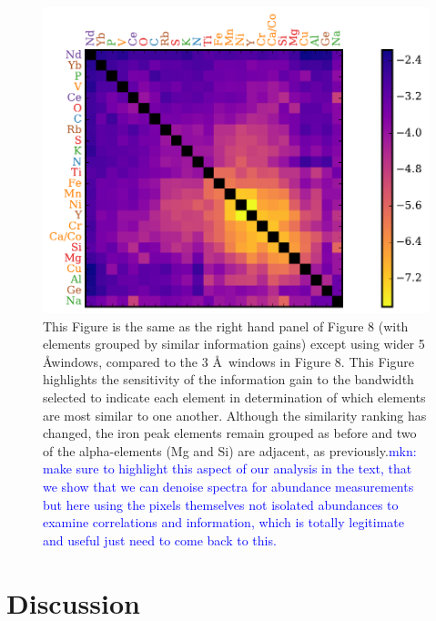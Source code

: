 \documentclass[a4paper,fleqn,usenatbib]{mnras}
\begin{document}
\begin{figure}
	\includegraphics[width=\columnwidth]{apogee_centers_final_29502_spc_sorted_inf_gains_abs_min_tot_dist.pdf}
    \caption{This Figure is the same as the right hand panel of Figure 8 (with elements grouped by similar information gains) except using wider 5 \AA windows, compared to the 3 \AA\ windows in Figure 8.  This Figure highlights the sensitivity of the information gain to the bandwidth selected to indicate each element in determination of which elements are most similar to one another. Although the similarity ranking has changed, the iron peak elements remain grouped as before and two of the alpha-elements (Mg and Si) are adjacent, as previously.\textcolor{blue}{mkn: make sure to highlight this aspect of our analysis in the text, that we show that we can denoise spectra for abundance measurements but here using the pixels themselves not isolated abundances to examine correlations and information, which is totally legitimate and useful just need to come back to this. }}
    \label{fig:single_element_errs_wide}
\end{figure}




\section{Discussion}
\end{document}
